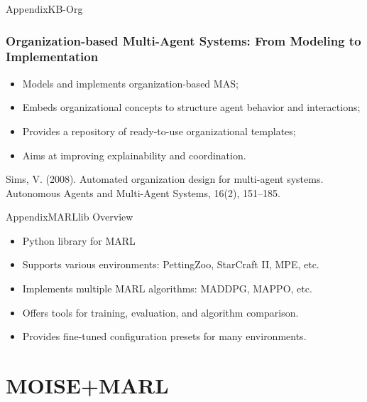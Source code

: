 \begin{frame}{Appendix}{KB-Org}
    \frametitle{Organization-based Multi-Agent Systems: From Modeling to Implementation}

    \begin{itemize}
        \item Models and implements organization-based MAS;
        \item Embeds organizational concepts to structure agent behavior and interactions;
        \item Provides a repository of ready-to-use organizational templates;
        \item Aims at improving explainability and coordination.
    \end{itemize}

    \vspace{1em}
    Sims, V. (2008). Automated organization design for multi-agent systems. Autonomous Agents and Multi-Agent Systems, 16(2), 151–185.

\end{frame}

\begin{frame}{Appendix}{MARLlib Overview}

    \begin{itemize}
        \item Python library for MARL
        \item Supports various environments: PettingZoo, StarCraft II, MPE, etc.
        \item Implements multiple MARL algorithms: MADDPG, MAPPO, etc.
        \item Offers tools for training, evaluation, and algorithm comparison.
        \item Provides fine-tuned configuration presets for many environments.
    \end{itemize}

\end{frame}

\section{MOISE+MARL}

